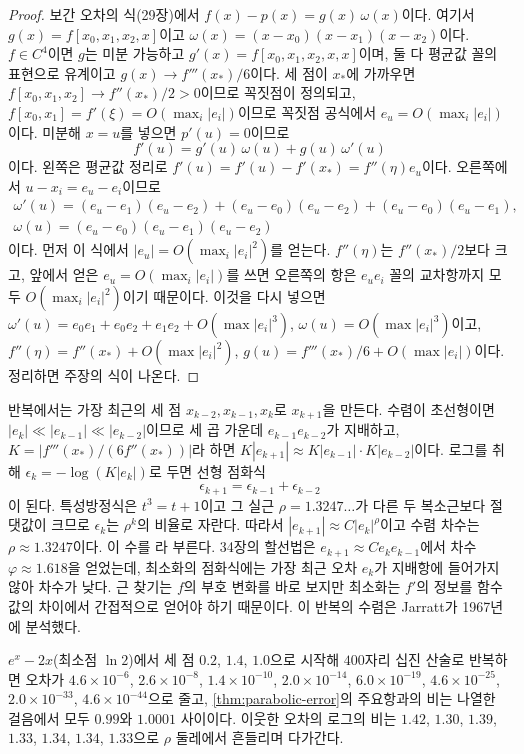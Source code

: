 \begin{proof}
보간 오차의 식(29장)에서 $f(x)-p(x)=g(x)\,\omega(x)$이다. 여기서 $g(x)=f[x_0,x_1,x_2,x]$이고 $\omega(x)=(x-x_0)(x-x_1)(x-x_2)$이다. $f\in C^4$이면 $g$는 미분 가능하고 $g'(x)=f[x_0,x_1,x_2,x,x]$이며, 둘 다 평균값 꼴의 표현으로 유계이고 $g(x)\to f'''(x_\ast)/6$이다. 세 점이 $x_\ast$에 가까우면 $f[x_0,x_1,x_2]\to f''(x_\ast)/2>0$이므로 꼭짓점이 정의되고, $f[x_0,x_1]=f'(\xi)=O(\max_i|e_i|)$이므로 꼭짓점 공식에서 $e_u=O(\max_i|e_i|)$이다. 미분해 $x=u$를 넣으면 $p'(u)=0$이므로
\[
f'(u)=g'(u)\,\omega(u)+g(u)\,\omega'(u)
\]
이다. 왼쪽은 평균값 정리로 $f'(u)=f'(u)-f'(x_\ast)=f''(\eta)e_u$이다. 오른쪽에서 $u-x_i=e_u-e_i$이므로
\begin{gather*}
\omega'(u)=(e_u-e_1)(e_u-e_2)+(e_u-e_0)(e_u-e_2)+(e_u-e_0)(e_u-e_1),\\
\omega(u)=(e_u-e_0)(e_u-e_1)(e_u-e_2)
\end{gather*}
이다. 먼저 이 식에서 $|e_u|=O(\max_i|e_i|^2)$를 얻는다. $f''(\eta)$는 $f''(x_\ast)/2$보다 크고, 앞에서 얻은 $e_u=O(\max_i|e_i|)$를 쓰면 오른쪽의 항은 $e_ue_i$ 꼴의 교차항까지 모두 $O(\max_i|e_i|^2)$이기 때문이다. 이것을 다시 넣으면 $\omega'(u)=e_0e_1+e_0e_2+e_1e_2+O(\max|e_i|^3)$, $\omega(u)=O(\max|e_i|^3)$이고, $f''(\eta)=f''(x_\ast)+O(\max|e_i|^2)$, $g(u)=f'''(x_\ast)/6+O(\max|e_i|)$이다. 정리하면 주장의 식이 나온다.
\end{proof}

반복에서는 가장 최근의 세 점 $x_{k-2},x_{k-1},x_k$로 $x_{k+1}$을 만든다. 수렴이 초선형이면 $|e_k|\ll|e_{k-1}|\ll|e_{k-2}|$이므로 세 곱 가운데 $e_{k-1}e_{k-2}$가 지배하고, $K=|f'''(x_\ast)/(6f''(x_\ast))|$라 하면 $K|e_{k+1}|\approx K|e_{k-1}|\cdot K|e_{k-2}|$이다. 로그를 취해 $\epsilon_k=-\log(K|e_k|)$로 두면 선형 점화식
\[
\epsilon_{k+1}=\epsilon_{k-1}+\epsilon_{k-2}
\]
이 된다. 특성방정식은 $t^3=t+1$이고 그 실근 $\rho=1.3247\ldots$가 다른 두 복소근보다 절댓값이 크므로 $\epsilon_k$는 $\rho^k$의 비율로 자란다. 따라서 $|e_{k+1}|\approx C|e_k|^\rho$이고 수렴 차수는 $\rho\approx1.3247$이다. 이 수를 라 부른다. 34장의 할선법은 $e_{k+1}\approx Ce_ke_{k-1}$에서 차수 $\varphi\approx1.618$을 얻었는데, 최소화의 점화식에는 가장 최근 오차 $e_k$가 지배항에 들어가지 않아 차수가 낮다. 근 찾기는 $f$의 부호 변화를 바로 보지만 최소화는 $f'$의 정보를 함수값의 차이에서 간접적으로 얻어야 하기 때문이다. 이 반복의 수렴은 Jarratt가 1967년에 분석했다\cite{jarratt1967}.

$e^x-2x$(최소점 $\ln2$)에서 세 점 $0.2$, $1.4$, $1.0$으로 시작해 $400$자리 십진 산술로 반복하면 오차가 $4.6\times10^{-6}$, $2.6\times10^{-8}$, $1.4\times10^{-10}$, $2.0\times10^{-14}$, $6.0\times10^{-19}$, $4.6\times10^{-25}$, $2.0\times10^{-33}$, $4.6\times10^{-44}$으로 줄고, \cref{thm:parabolic-error}의 주요항과의 비는 나열한 걸음에서 모두 $0.99$와 $1.0001$ 사이이다. 이웃한 오차의 로그의 비는 $1.42$, $1.30$, $1.39$, $1.33$, $1.34$, $1.34$, $1.33$으로 $\rho$ 둘레에서 흔들리며 다가간다.

